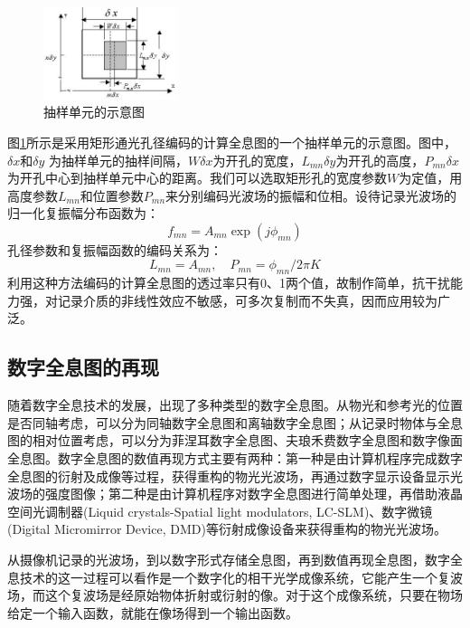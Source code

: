\documentclass[10pt,a4paper,twocolumn,twoside,UTF8]{ctexart}
\begin{document}
		\begin{figure}[H]
			\centering
			\includegraphics[width=0.35\textwidth]{img//chouyang.jpg}
			\caption{抽样单元的示意图}
			\label{chouyang}
		\end{figure}
		图\ref{chouyang}所示是采用矩形通光孔径编码的计算全息图的一个抽样单元的示意图。图中，$\delta x$和$\delta y$ 为抽样单元的抽样间隔，$W\delta x$为开孔的宽度，$L_{mn}\delta y$为开孔的高度，$P_{mn}\delta x$为开孔中心到抽样单元中心的距离。我们可以选取矩形孔的宽度参数$W$为定值，用高度参数$L_{mn}$和位置参数$P_{mn}$来分别编码光波场的振幅和位相。设待记录光波场的归一化复振幅分布函数为：
		\begin{equation}
			f_{mn}=A_{mn}\exp(j\phi_{mn})
		\end{equation}
		孔径参数和复振幅函数的编码关系为：
		\begin{equation}
			L_{mn}=A_{mn},\quad P_{mn}=\phi_{mn}/2\pi K
		\end{equation}
		利用这种方法编码的计算全息图的透过率只有0、1两个值，故制作简单，抗干扰能力强，对记录介质的非线性效应不敏感，可多次复制而不失真，因而应用较为广泛。

	\subsection{数字全息图的再现}
	随着数字全息技术的发展，出现了多种类型的数字全息图。从物光和参考光的位置是否同轴考虑，可以分为同轴数字全息图和离轴数字全息图；从记录时物体与全息图的相对位置考虑，可以分为菲涅耳数字全息图、夫琅禾费数字全息图和数字像面全息图。数字全息图的数值再现方式主要有两种：第一种是由计算机程序完成数字全息图的衍射及成像等过程，获得重构的物光光波场，再通过数字显示设备显示光波场的强度图像；第二种是由计算机程序对数字全息图进行简单处理，再借助液晶空间光调制器(Liquid crystals-Spatial light modulators, LC-SLM)、数字微镜(Digital Micromirror Device, DMD)等衍射成像设备来获得重构的物光光波场。

	从摄像机记录的光波场，到以数字形式存储全息图，再到数值再现全息图，数字全息技术的这一过程可以看作是一个数字化的相干光学成像系统，它能产生一个复波场，而这个复波场是经原始物体折射或衍射的像。对于这个成像系统，只要在物场给定一个输入函数，就能在像场得到一个输出函数。
\end{document}
